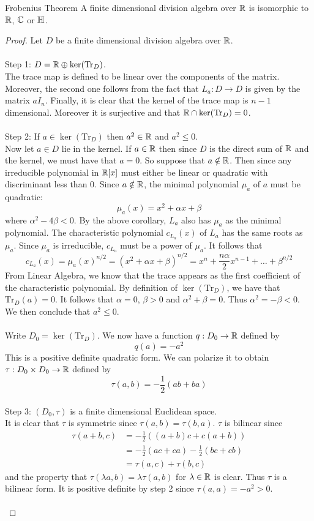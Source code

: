 \documentclass[a4paper]{article}
\begin{document}
\begin{thm}{Frobenius Theorem}{} A finite dimensional division algebra over $\mathbb{R}$ is isomorphic to $\mathbb{R}$, $\mathbb{C}$ or $\mathbb{H}$. \tcbline
\begin{proof}
Let $D$ be a finite dimensional division algebra over $\mathbb{R}$. \\~\\

Step 1: $D=\mathbb{R}\oplus\ker(\text{Tr}_D)$. \\
The trace map is defined to be linear over the components of the matrix. Moreover, the second one follows from the fact that $L_a:D\to D$ is given by the matrix $aI_n$. Finally, it is clear that the kernel of the trace map is $n-1$ dimensional. Moreover it is surjective and that $\mathbb{R}\cap\ker(\text{Tr}_D)=0$. \\~\\

Step 2: If $a\in\ker(\text{Tr}_D)$ then $a^2\in\mathbb{R}$ and $a^2\leq 0$. \\
Now let $a\in D$ lie in the kernel. If $a\in\mathbb{R}$ then since $D$ is the direct sum of $\mathbb{R}$ and the kernel, we must have that $a=0$. So suppose that $a\notin\mathbb{R}$. Then since any irreducible polynomial in $\mathbb{R}[x]$ must either be linear or quadratic with discriminant less than $0$. Since $a\notin\mathbb{R}$, the minimal polynomial $\mu_a$ of $a$ must be quadratic: $$\mu_a(x)=x^2+\alpha x+\beta$$ where $\alpha^2-4\beta<0$. By the above corollary, $L_a$ also has $\mu_a$ as the minimal polynomial. The characteristic polynomial $c_{L_a}(x)$ of $L_a$ has the same roots as $\mu_a$. Since $\mu_a$ is irreducible, $c_{L_a}$ must be a power of $\mu_a$. It follows that $$c_{L_a}(x)=\mu_a(x)^{n/2}=(x^2+\alpha x+\beta)^{n/2}=x^n+\frac{n\alpha}{2}x^{n-1}+\dots+\beta^{n/2}$$ From Linear Algebra, we know that the trace appears as the first coefficient of the characteristic polynomial. By definition of $\ker(\text{Tr}_D)$, we have that $\text{Tr}_D(a)=0$. It follows that $\alpha=0$, $\beta>0$ and $\alpha^2+\beta=0$. Thus $\alpha^2=-\beta<0$. We then conclude that $a^2\leq 0$. \\~\\

Write $D_0=\ker(\text{Tr}_D)$. We now have a function $q:D_0\to\mathbb{R}$ defined by $$q(a)=-a^2$$ This is a positive definite quadratic form. We can polarize it to obtain $\tau:D_0\times D_0\to\mathbb{R}$ defined by $$\tau(a,b)=-\frac{1}{2}(ab+ba)$$~\\

Step 3: $(D_0,\tau)$ is a finite dimensional Euclidean space. \\
It is clear that $\tau$ is symmetric since $\tau(a,b)=\tau(b,a)$. $\tau$ is bilinear since 
\begin{align*}
\tau(a+b,c)&=-\frac{1}{2}((a+b)c+c(a+b))\\
&=-\frac{1}{2}(ac+ca)-\frac{1}{2}(bc+cb)\\
&=\tau(a,c)+\tau(b,c)
\end{align*} and the property that $\tau(\lambda a,b)=\lambda\tau(a,b)$ for $\lambda\in\mathbb{R}$ is clear. Thus $\tau$ is a bilinear form. It is positive definite by step 2 since $\tau(a,a)=-a^2>0$. \\~\\


\end{proof}
\end{thm}
\end{document}
